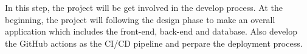 In this step, the project will be get involved in the develop process. 
At the beginning, the project will following the design phase to make 
an overall application which includes the front-end, back-end and database.
Also develop the GitHub actions as the CI/CD pipeline and perpare the 
deployment process. 
